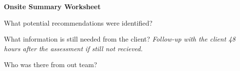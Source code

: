 \documentclass[./main.tex]{subfiles}
\begin{document}
\begin{center}
\Large\textbf{Onsite Summary Worksheet}
\end{center}


\noindent What potential recommendations were identified? 

\vspace{10cm}

\noindent What information is still needed from the client? \emph{Follow-up with the client 48 hours after the assessment if still not recieved. }

\vspace{4cm}

\noindent Who was there from out team? 

\vspace{4cm}


\end{document}
